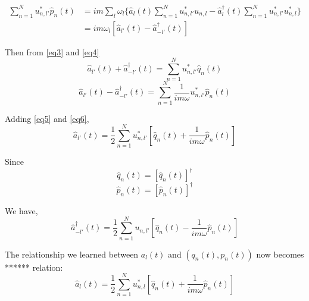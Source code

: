 \documentclass{article}
\begin{document}
\begin{align}
    \sum_{ n = 1 }^N u^*_{ n, l' } \hat{p}_n (t) &= i m \sum_l \omega_l \biggl\lbrace \hat{a}_l (t) \sum_{ n = 1 }^N u^*_{ n, l' } u_{ n, l } - \hat{a}^\dagger_l (t) \sum_{ n = 1 }^N u^*_{ n, l' } u^*_{ n, l } \biggr\rbrace \nonumber \\
    &= i m \omega_l \left[ \hat{a}_{l'} (t) - \hat{a}^\dagger_{-l'} (t)  \right] \label{eq4} %
\end{align}

Then from \eqref{eq3} and \eqref{eq4} 
\begin{equation}
    \hat{a}_{l'} (t) + \hat{a}^\dagger_{-l'} (t) = \sum_{n = 1}^N u^*_{n, l'} \hat{q}_n(t) \label{eq5}
\end{equation} 
\begin{equation}
    \hat{a}_{l'} (t) - \hat{a}^\dagger_{-l'} (t) = \sum_{n = 1}^N \frac{1}{im\omega} u^*_{n, l'} \hat{p}_n(t) \label{eq6}
\end{equation} 

Adding \eqref{eq5} and \eqref{eq6},
\begin{equation}
    \hat{a}_{l'} (t) = \frac{1}{2} \sum_{n = 1}^N u^*_{n, l'} \left [ \hat{q}_n(t) + \frac{1}{im\omega}  \hat{p}_n(t) \right ]
\end{equation}

Since
\begin{equation*}
    \hat{q}_n (t) = [\hat{q}_n (t)]^\dagger
\end{equation*}
\begin{equation*}
        \hat{p}_n (t) = [\hat{p}_n (t)]^\dagger
\end{equation*}

We have,
\begin{equation*}
    \hat{a}^\dagger_{-l'} (t) = \frac{1}{2} \sum_{n = 1}^N u_{n, l'} \left [ \hat{q}_n(t) - \frac{1}{im\omega}  \hat{p}_n(t) \right ]
\end{equation*}

The relationship we learned between $a_l (t)$ and $(q_n (t), p_n (t))$ now becomes ****** relation: 
\begin{equation*}
    \hat{a}_l (t) = \frac{1}{2} \sum_{n = 1}^N u^*_{n, l} \left [ \hat{q}_n(t) + \frac{1}{im\omega}  \hat{p}_n(t) \right ]
\end{equation*}
\end{document}
